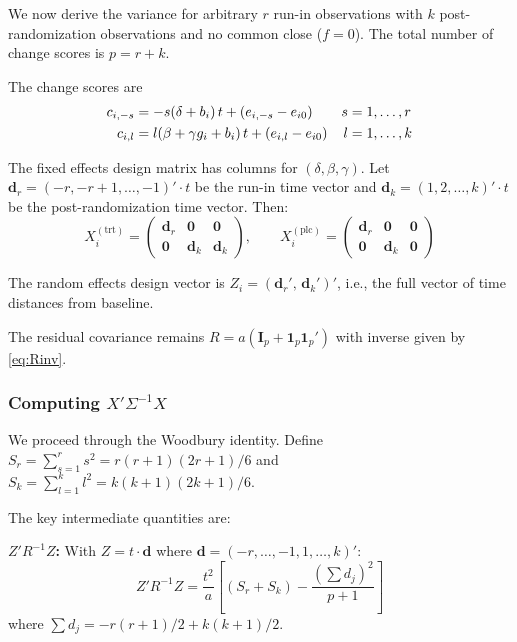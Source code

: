 \documentclass[
]{article}
\begin{document}
We now derive the variance for arbitrary \(r\) run-in observations with
\(k\) post-randomization observations and no common close (\(f = 0\)).
The total number of change scores is \(p = r + k\).

The change scores are \begin{align}
  c_{i,-s} &= -s(\delta + b_i)\,t + (e_{i,-s} - e_{i0})
    & s &= 1,\ldots,r \notag \\
  c_{i,l}  &= l(\beta + \gamma g_i + b_i)\,t
    + (e_{i,l} - e_{i0})
    & l &= 1,\ldots,k
\end{align}

The fixed effects design matrix has columns for
\((\delta, \beta, \gamma)\). Let \(\mathbf{d}_r = (-r, -r+1,
\ldots, -1)' \cdot t\) be the run-in time vector and
\(\mathbf{d}_k = (1, 2, \ldots, k)' \cdot t\) be the post-randomization
time vector. Then: \[
  X_i^{(\text{trt})} = \begin{pmatrix}
    \mathbf{d}_r & \mathbf{0} & \mathbf{0} \\
    \mathbf{0}   & \mathbf{d}_k & \mathbf{d}_k
  \end{pmatrix}, \qquad
  X_i^{(\text{plc})} = \begin{pmatrix}
    \mathbf{d}_r & \mathbf{0} & \mathbf{0} \\
    \mathbf{0}   & \mathbf{d}_k & \mathbf{0}
  \end{pmatrix}
\]

The random effects design vector is
\(Z_i = (\mathbf{d}_r',\, \mathbf{d}_k')'\), i.e., the full vector of
time distances from baseline.

The residual covariance remains \(R = a(\mathbf{I}_p +
\mathbf{1}_p\mathbf{1}_p')\) with inverse given by \eqref{eq:Rinv}.

\subsubsection{\texorpdfstring{Computing
\(X'\Sigma^{-1}X\)}{Computing X\textquotesingle\textbackslash Sigma\^{}\{-1\}X}}\label{computing-xsigma-1x}

We proceed through the Woodbury identity. Define
\(S_r = \sum_{s=1}^r s^2 = r(r+1)(2r+1)/6\) and
\(S_k = \sum_{l=1}^k l^2 = k(k+1)(2k+1)/6\).

The key intermediate quantities are:

\textbf{\(Z'R^{-1}Z\):} With \(Z = t \cdot \mathbf{d}\) where
\(\mathbf{d} = (-r,\ldots,-1,1,\ldots,k)'\): \begin{equation}
  Z'R^{-1}Z = \frac{t^2}{a}\left[
    (S_r + S_k)
    - \frac{(\sum d_j)^2}{p+1}
  \right]
  \label{eq:ZRZ_general}
\end{equation} where \(\sum d_j = -r(r+1)/2 + k(k+1)/2\).
\end{document}
